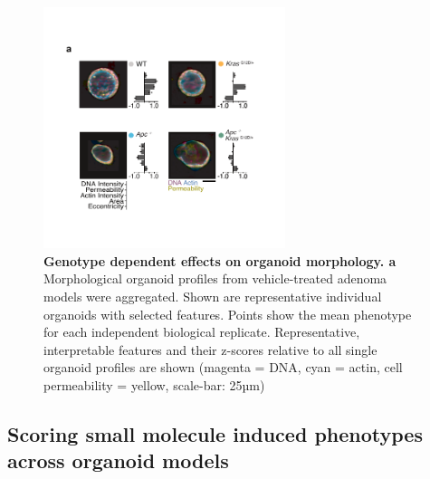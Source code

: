 \begin{flushleft}
\begin{figure}[h!]
\centering
\includegraphics[width=200pt,
                height=\textheight,
                keepaspectratio]{figures/adenomaprofiling/pdf/fig_1_3.pdf}
\caption[Genotype dependent effects on organoid morphology]{\textbf{Genotype dependent effects on organoid morphology. a}  Morphological organoid profiles from vehicle-treated adenoma models were aggregated. Shown are representative individual organoids with selected features. Points show the mean phenotype for each independent biological replicate. Representative, interpretable features and their z-scores relative to all single organoid profiles are shown (magenta = DNA, cyan = actin, cell permeability = yellow, scale-bar: 25µm)}
\label{fig_130}
\end{figure}
\bigbreak



\subsection{Scoring small molecule induced phenotypes across organoid models}


\end{flushleft}
